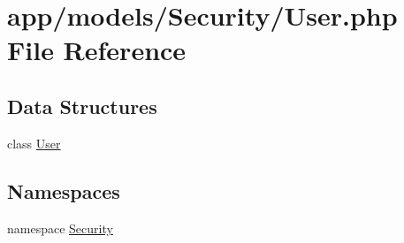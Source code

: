 \hypertarget{_user_8php}{\section{app/models/\-Security/\-User.php File Reference}
\label{_user_8php}
}
\subsection*{Data Structures}
\begin{DoxyCompactItemize}
\item 
class \hyperlink{class_security_1_1_user}{User}
\end{DoxyCompactItemize}
\subsection*{Namespaces}
\begin{DoxyCompactItemize}
\item 
namespace \hyperlink{namespace_security}{Security}
\end{DoxyCompactItemize}
